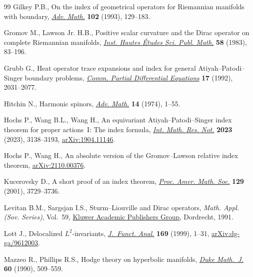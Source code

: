 \begin{thebibliography}{99}
Gilkey P.B., On the index of geometrical operators for {R}iemannian manifolds
 with boundary, \href{https://doi.org/10.1006/aima.1993.1063}{\textit{Adv. Math.}} \textbf{102} (1993), 129--183.

Gromov M., Lawson Jr. H.B., Positive scalar curvature and the {D}irac operator
 on complete {R}iemannian manifolds, \href{https://doi.org/10.1007/BF02953774}{\textit{Inst. Hautes \'Etudes Sci. Publ.
 Math.}} \textbf{58} (1983), 83--196.

Grubb G., Heat operator trace expansions and index for general
 {A}tiyah--{P}atodi--{S}inger boundary problems, \href{https://doi.org/10.1080/03605309208820913}{\textit{Comm. Partial
 Differential Equations}} \textbf{17} (1992), 2031--2077.

Hitchin N., Harmonic spinors, \href{https://doi.org/10.1016/0001-8708(74)90021-8}{\textit{Adv. Math.}} \textbf{14} (1974), 1--55.

Hochs P., Wang B.L., Wang H., An equivariant {A}tiyah--{P}atodi--{S}inger index
 theorem for proper actions~{I}: {T}he index formula, \href{https://doi.org/10.1093/imrn/rnab324}{\textit{Int. Math. Res.
 Not.}} \textbf{2023} (2023), 3138--3193, \href{https://arxiv.org/abs/1904.11146}{arXiv:1904.11146}.

Hochs P., Wang H., An absolute version of the {G}romov--{L}awson relative index
 theorem, \href{https://arxiv.org/abs/2110.00376}{arXiv:2110.00376}.

Kucerovsky D., A short proof of an index theorem, \href{https://doi.org/10.1090/S0002-9939-01-06164-0}{\textit{Proc. Amer. Math.
 Soc.}} \textbf{129} (2001), 3729--3736.

Levitan B.M., Sargsjan I.S., Sturm--{L}iouville and {D}irac operators,
 \textit{Math. Appl. (Sov. Series)}, Vol.~59, \href{https://doi.org/10.1007/978-94-011-3748-5}{Kluwer Academic Publishers
 Group}, Dordrecht, 1991.

Lott J., Delocalized {$L^2$}-invariants, \href{https://doi.org/10.1006/jfan.1999.3451}{\textit{J.~Funct. Anal.}} \textbf{169}
 (1999), 1--31, \href{https://arxiv.org/abs/dg-ga/9612003}{arXiv:dg-ga/9612003}.

Mazzeo R., Phillips R.S., Hodge theory on hyperbolic manifolds, \href{https://doi.org/10.1215/S0012-7094-90-06021-1}{\textit{Duke
 Math.~J.}} \textbf{60} (1990), 509--559.


\end{thebibliography}
